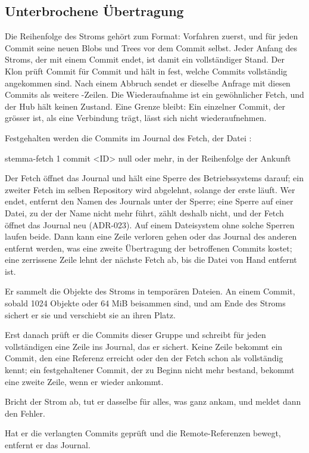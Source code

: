 \subsection[sec:fetch-resume]{Unterbrochene Übertragung}

Die Reihenfolge des Stroms gehört zum Format: Vorfahren zuerst, und für jeden Commit seine neuen
Blobs und Trees vor dem Commit selbst.
Jeder Anfang des Stroms, der mit einem Commit endet, ist damit ein vollständiger Stand.
Der Klon prüft Commit für Commit und hält in  fest, welche Commits vollständig
angekommen sind.
Nach einem Abbruch sendet er dieselbe Anfrage mit diesen Commits als weitere -Zeilen.
Die Wiederaufnahme ist ein gewöhnlicher Fetch, und der Hub hält keinen Zustand.
Eine Grenze bleibt: Ein einzelner Commit, der grösser ist, als eine Verbindung trägt, lässt sich
nicht wiederaufnehmen.

Festgehalten werden die Commits im Journal des Fetch, der Datei :

\starttyping
stemma-fetch 1
commit <ID>          null oder mehr, in der Reihenfolge der Ankunft
\stoptyping

\startitemize[n]
\item Der Fetch öffnet das Journal und hält eine Sperre des Betriebssystems darauf; ein zweiter
Fetch im selben Repository wird abgelehnt, solange der erste läuft.
Wer endet, entfernt den Namen des Journals unter der Sperre; eine Sperre auf einer Datei, zu der
der Name nicht mehr führt, zählt deshalb nicht, und der Fetch öffnet das Journal neu (ADR-023).
Auf einem Dateisystem ohne solche Sperren laufen beide.
Dann kann eine Zeile verloren gehen oder das Journal des anderen entfernt werden, was eine
zweite Übertragung der betroffenen Commits kostet; eine zerrissene Zeile lehnt der nächste Fetch
ab, bis die Datei von Hand entfernt ist.
\item Er sammelt die Objekte des Stroms in temporären Dateien.
An einem Commit, sobald 1024 Objekte oder 64 MiB beisammen sind, und am Ende des Stroms sichert er
sie und verschiebt sie an ihren Platz.
\item Erst danach prüft er die Commits dieser Gruppe und schreibt für jeden vollständigen eine
Zeile ins Journal, das er sichert.
Keine Zeile bekommt ein Commit, den eine Referenz erreicht oder den der Fetch schon als
vollständig kennt; ein festgehaltener Commit, der zu Beginn nicht mehr bestand, bekommt eine
zweite Zeile, wenn er wieder ankommt.
\item Bricht der Strom ab, tut er dasselbe für alles, was ganz ankam, und meldet dann den Fehler.
\item Hat er die verlangten Commits geprüft und die Remote-Referenzen bewegt, entfernt er das
Journal.
\stopitemize

